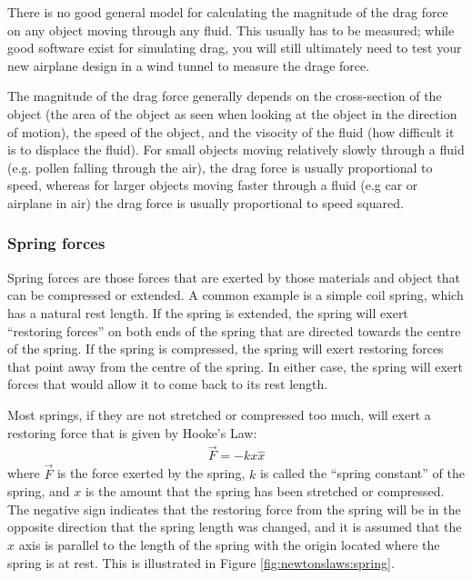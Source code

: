 There is no good general model for calculating the magnitude of the drag force on any object moving through any fluid. This usually has to be measured; while good software exist for simulating drag, you will still ultimately need to test your new airplane design in a wind tunnel to measure the drage force.

 The magnitude of the drag force generally depends on the cross-section of the object (the area of the object as seen when looking at the object in the direction of motion), the speed of the object, and the visocity of the fluid (how difficult it is to displace the fluid). For small objects moving relatively slowly through a fluid (e.g. pollen falling through the air), the drag force is usually proportional to speed, whereas for larger objects moving faster through a fluid (e.g car or airplane in air) the drag force is usually proportional to speed squared.

\subsubsection{Spring forces}
Spring forces are those forces that are exerted by those materials and object that can be compressed or extended. A common example is a simple coil spring, which has a natural rest length. If the spring is extended, the spring will exert ``restoring forces'' on both ends of the spring that are directed towards the centre of the spring. If the spring is compressed, the spring will exert restoring forces that point away from the centre of the spring. In either case, the spring will exert forces that would allow it to come back to its rest length.

Most springs, if they are not stretched or compressed too much, will exert a restoring force that is given by Hooke's Law:
\begin{align*}
\vec F = -kx \hat x
\end{align*}
where $\vec F$ is the force exerted by the spring, $k$ is called the ``spring constant'' of the spring, and $x$ is the amount that the spring has been stretched or compressed. The negative sign indicates that the restoring force from the spring will be in the opposite direction that the spring length was changed, and it is assumed that the $x$ axis is parallel to the length of the spring with the origin located where the spring is at rest. This is illustrated in Figure \ref{fig:newtonslaws:spring}.


